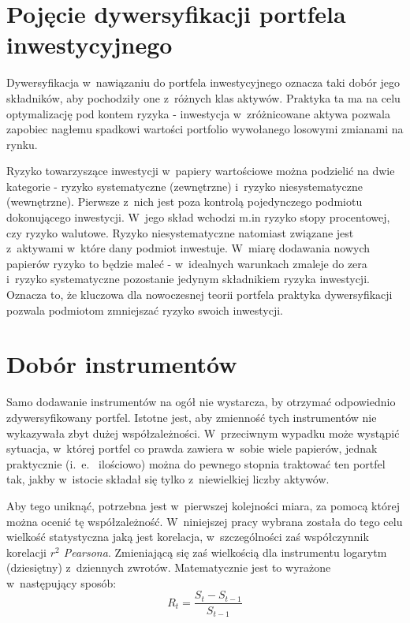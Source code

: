 \documentclass[12pt,a4paper,twoside,openany]{book}
\begin{document}
\section{Pojęcie dywersyfikacji portfela inwestycyjnego}

Dywersyfikacja w~nawiązaniu do portfela inwestycyjnego oznacza taki dobór jego składników, aby pochodziły one z~różnych klas aktywów. 
Praktyka ta ma na celu optymalizację pod kontem ryzyka - inwestycja w~zróżnicowane aktywa pozwala zapobiec nagłemu spadkowi wartości portfolio wywołanego losowymi zmianami na rynku.

Ryzyko towarzyszące inwestycji w~papiery wartościowe można podzielić na dwie kategorie  - ryzyko systematyczne (zewnętrzne) i~ryzyko niesystematyczne (wewnętrzne). 
Pierwsze z~nich jest poza kontrolą pojedynczego podmiotu dokonującego inwestycji.
W~jego skład wchodzi m.in ryzyko stopy procentowej, czy ryzyko walutowe. 
Ryzyko niesystematyczne natomiast związane jest z~aktywami w~które dany podmiot inwestuje. 
W~miarę dodawania nowych papierów ryzyko to będzie maleć - w~idealnych warunkach zmaleje do zera i~ryzyko systematyczne pozostanie jedynym składnikiem ryzyka inwestycji.
Oznacza to, że kluczowa dla nowoczesnej teorii portfela praktyka dywersyfikacji pozwala podmiotom zmniejszać ryzyko swoich inwestycji.


\section{Dobór instrumentów}

Samo dodawanie instrumentów na ogół nie wystarcza, by otrzymać odpowiednio zdywersyfikowany portfel.
Istotne jest, aby zmienność tych instrumentów nie wykazywała zbyt dużej współzależności.
W~przeciwnym wypadku może wystąpić sytuacja, w~której portfel co prawda zawiera w~sobie wiele papierów, jednak praktycznie (i.~e.~ ilościowo) można do pewnego stopnia traktować ten portfel tak, jakby w~istocie składał się tylko z~niewielkiej liczby aktywów.

Aby tego uniknąć, potrzebna jest w~pierwszej kolejności miara, za pomocą której można ocenić tę współzależność. 
W~niniejszej pracy wybrana została do tego celu wielkość statystyczna jaką jest korelacja, w~szczególności zaś współczynnik korelacji \textit{$r^2$ Pearsona}. 
Zmieniającą się zaś wielkością dla instrumentu logarytm (dziesiętny) z~dziennych zwrotów.
Matematycznie jest to wyrażone w~następujący sposób:
\begin{equation}
    R_t = \frac{S_t - S_{t-1}}{S_{t-1}}
\end{equation}
\end{document}
